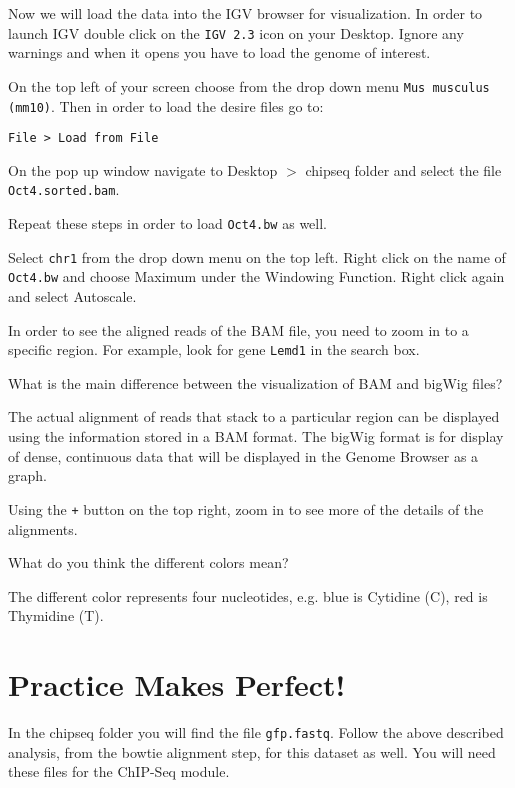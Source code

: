 \begin{steps}
Now we will load the data into the IGV browser for visualization. In order to
launch IGV double click on the \texttt{IGV 2.3} icon on your Desktop. Ignore any warnings
and when it opens you have to load the genome of interest.

On the top left of your screen choose from the drop down menu \texttt{Mus musculus
(mm10)}. Then in order to load the desire files go to:

\begin{lstlisting}[style=command_syntax]
File > Load from File
\end{lstlisting}

On the pop up window navigate to Desktop $>$ chipseq folder and select the file
\texttt{Oct4.sorted.bam}.

Repeat these steps in order to load \texttt{Oct4.bw} as well.

Select \texttt{chr1} from the drop down menu on the top left. Right click on the name of
\texttt{Oct4.bw} and choose Maximum under the Windowing Function. Right click again and
select Autoscale.

In order to see the aligned reads of the BAM file, you need to zoom in to a
specific region. For example, look for gene \texttt{Lemd1} in the search box.
\end{steps}

\begin{questions}
What is the main difference between the visualization of BAM and bigWig files?
\begin{answer}
The actual alignment of reads that stack to a particular region can be displayed
using the information stored in a BAM format.
The bigWig format is for display of dense, continuous data that will be
displayed in the Genome Browser as a graph.
\end{answer}
\end{questions}

Using the \texttt{+} button on the top right, zoom in to see more of the details of the alignments.

\begin{questions}
What do you think the different colors mean?
\begin{answer}
The different color represents four nucleotides, e.g. blue is Cytidine (C), red
is Thymidine (T).
\end{answer}
\end{questions}

\section{Practice Makes Perfect!}
\begin{steps}
In the chipseq folder you will find the file \texttt{gfp.fastq}. Follow the
above described analysis, from the bowtie alignment step, for this dataset as
well. You will need these files for the ChIP-Seq module.
\end{steps}
